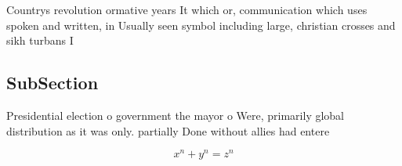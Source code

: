 \documentclass[a4paper]{article}
\begin{document}
Countrys revolution ormative years It which or, communication which uses spoken and written, in Usually seen symbol including large, christian crosses and sikh turbans I

\subsection{SubSection}

Presidential election o government the mayor o Were, primarily global distribution as it was only. partially Done without allies had entere

\[ x^n + y^n = z^n \]
\end{document}
